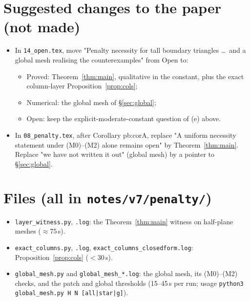 \documentclass[11pt]{article}
\theoremstyle{remark}\newtheorem{remark}[theorem]{Remark}
\begin{document}
\section{Suggested changes to the paper (not made)}
\begin{itemize}
\item In \texttt{14\_open.tex}, move "Penalty necessity for tall boundary triangles \dots\ and a global mesh realising the
  counterexamples" from Open to:
  \begin{itemize}
  \item Proved: Theorem~\ref{thm:main}, qualitative in the constant, plus the exact column-layer Proposition~\ref{prop:cols};
  \item Numerical: the global mesh of \S\ref{sec:global};
  \item Open: keep the explicit-moderate-constant question of (e) above.
  \end{itemize}
\item In \texttt{08\_penalty.tex}, after Corollary pb:corA, replace "A uniform necessity statement under (M0)--(M2) alone
  remains open" by Theorem~\ref{thm:main}. Replace "we have not written it out" (global mesh) by a pointer to
  \S\ref{sec:global}.
\end{itemize}

\section*{Files (all in \texttt{notes/v7/penalty/})}
\begin{itemize}
\item \texttt{layer\_witness.py}, \texttt{.log}: the Theorem~\ref{thm:main} witness on half-plane meshes ($\approx75$\,s).
\item \texttt{exact\_columns.py}, \texttt{.log}, \texttt{exact\_columns\_closedform.log}: Proposition~\ref{prop:cols} ($<30$\,s).
\item \texttt{global\_mesh.py} and \texttt{global\_mesh\_*.log}: the global mesh, its (M0)--(M2) checks, and the patch and
  global thresholds (15--45\,s per run; usage \texttt{python3 global\_mesh.py H N [all|star|g]}).
\end{itemize}
\end{document}
